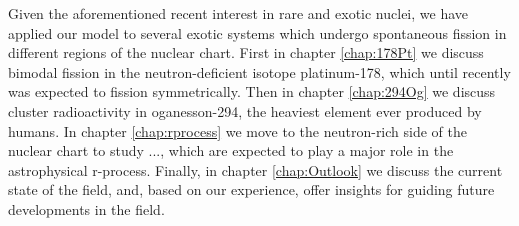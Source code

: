 Given the aforementioned recent interest in rare and exotic nuclei, we have applied our model to several exotic systems which undergo spontaneous fission in different regions of the nuclear chart. First in chapter \ref{chap:178Pt} we discuss bimodal fission in the neutron-deficient isotope platinum-178, which until recently was expected to fission symmetrically. Then in chapter \ref{chap:294Og} we discuss cluster radioactivity in oganesson-294, the heaviest element ever produced by humans. In chapter \ref{chap:rprocess} we move to the neutron-rich side of the nuclear chart to study ..., which are expected to play a major role in the astrophysical r-process. Finally, in chapter \ref{chap:Outlook} we discuss the current state of the field, and, based on our experience, offer insights for guiding future developments in the field.